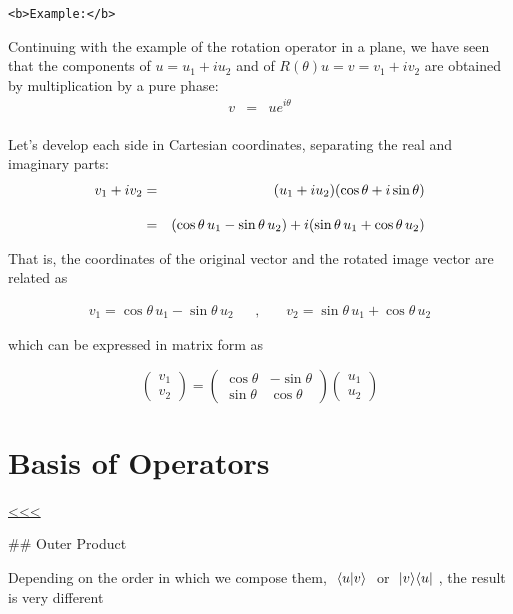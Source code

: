 \documentclass[11pt]{article}
\begin{document}
    \begin{verbatim}
<b>Example:</b> 
\end{verbatim}

Continuing with the example of the rotation operator in a plane, we have
seen that the components of \(u = u_1 + i u_2\) and of
\(R(\theta)u = v = v_1 + i v_2\) are obtained by multiplication by a
pure phase: \begin{eqnarray}
v &=& u e^{i\theta} \\
\end{eqnarray}

Let's develop each side in Cartesian coordinates, separating the real
and imaginary parts: \\
\begin{eqnarray}
v_1 + i v_2 &=& (u_1 + i u_2)(\cos \theta + i \sin \theta)  \\
    \rule{0mm}{6mm}
    &=& (\cos\theta \, u_1 - \sin \theta\,  u_2) + i(\sin\theta\,  u_1 + \cos \theta\,  u_2)
\end{eqnarray}

That is, the coordinates of the original vector and the rotated image
vector are related as

\begin{eqnarray}
v_1 = \cos\theta \, u_1 - \sin \theta\,  u_2 ~~~~~~~,~~~~~~~~
v_2 = \sin\theta \, u_1 + \cos \theta\,  u_2     
\end{eqnarray}

which can be expressed in matrix form as

\[
\begin{pmatrix} v_1 \\ v_2 \end{pmatrix} = \begin{pmatrix} \cos\theta & -\sin\theta \\ \sin\theta & \cos\theta \end{pmatrix} \begin{pmatrix} u_1 \\ u_2 \end{pmatrix}
\]

    \section{Basis of Operators}\label{basis-of-operators}

\hyperref[top]{<<<}

    \#\# Outer Product

Depending on the order in which we compose them, \(~\langle u|v\rangle~\) or
\(~| v\rangle \langle u|~\), the result is very different
\end{document}
